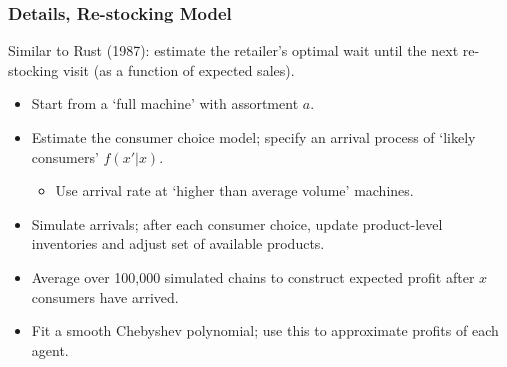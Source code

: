 \documentclass[aspectratio=169,11pt]{beamer}
\begin{document}
\begin{frame}[label=supplemental1]
\frametitle{Details, Re-stocking Model}
Similar to Rust (1987): estimate the retailer's optimal wait until the next re-stocking visit (as a function of expected sales).
\vfill
\begin{itemize}
\item Start from a `full machine' with assortment $a$.
\item Estimate the consumer choice model; specify an arrival process of `likely consumers' $f(x' | x)$.
\begin{itemize}
\item Use arrival rate at `higher than average volume' machines.%
\end{itemize}
\item Simulate arrivals; after each consumer choice, update product-level inventories and adjust set of available products.
\item Average over 100,000 simulated chains to construct expected profit after $x$ consumers have arrived.
\item Fit a smooth Chebyshev polynomial; use this to approximate profits of each agent.
\end{itemize}
\vfill
\hyperlink{main}{}
\end{frame}

\end{document}
